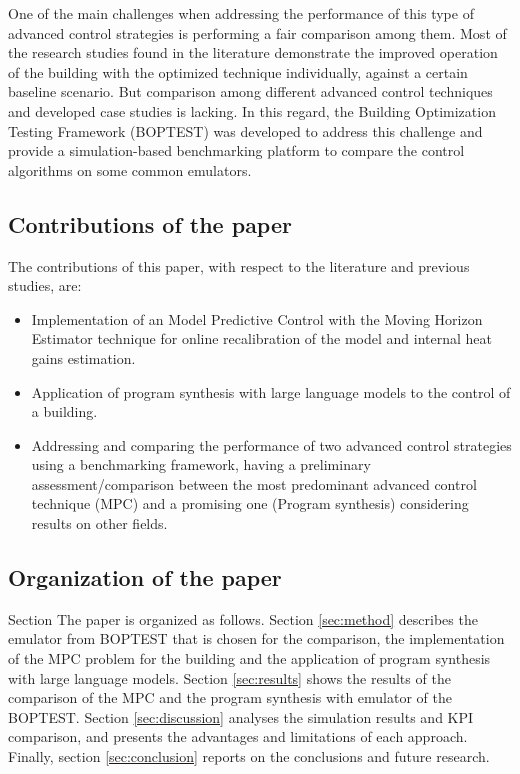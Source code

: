 One of the main challenges when addressing the performance of this type of advanced control strategies is performing a fair comparison among them. Most of the research studies found in the literature demonstrate the improved operation of the building with the optimized technique individually, against a certain baseline scenario. But comparison among different advanced control techniques and developed case studies is lacking. In this regard, the Building Optimization Testing Framework (BOPTEST) \cite{Blum2021} was developed to address this challenge and provide a simulation-based benchmarking platform to compare the control algorithms on some common emulators.

\subsection{Contributions of the paper}
\label{sec:contribution}
The contributions of this paper, with respect to the literature and previous studies, are:
\begin{itemize}
  \item Implementation of an Model Predictive Control with the Moving Horizon Estimator technique for online recalibration of the model and internal heat gains estimation.
  \item Application of program synthesis with large language models to the control of a building.
  \item Addressing and comparing the performance of two advanced control strategies using a benchmarking framework, having a preliminary assessment/comparison between the most predominant advanced control technique (MPC) and a promising one (Program synthesis) considering results on other fields.
\end{itemize}

\subsection{Organization of the paper}
Section \label{sec:organization}
The paper is organized as follows. Section \ref{sec:method}  describes the emulator from BOPTEST that is chosen for the comparison, the implementation of the MPC problem for the building and the application of program synthesis with large language models. Section \ref{sec:results} shows the results of the comparison of the MPC and the program synthesis with emulator of the BOPTEST. Section \ref{sec:discussion} analyses the simulation results and KPI comparison, and presents the advantages and limitations of each approach. Finally, section \ref{sec:conclusion} reports on the conclusions and future research.

